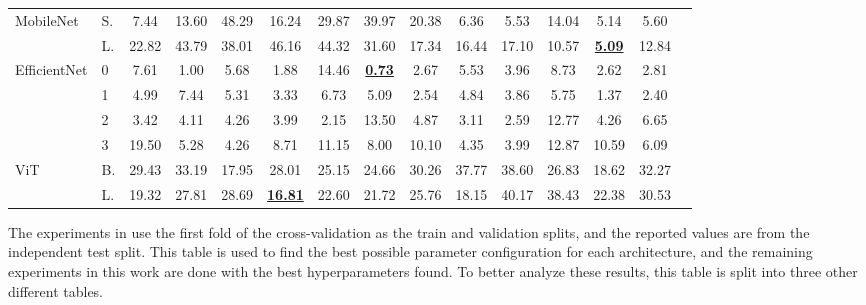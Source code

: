 \begin{table}[t!]
\begin{tabular}{llcccccc|ccccccc}
        \midrule
        \multirow{2}{*}{MobileNet} & S. & 7.44 & 13.60 & 48.29 & 16.24 & 29.87 & 39.97 & 20.38 & 6.36 & 5.53 & 14.04 & 5.14 & 5.60 \\
                                & L. & 22.82 & 43.79 & 38.01 & 46.16 & 44.32 & 31.60 & 17.34 & 16.44 & 17.10 & 10.57 & \underline{\textbf{5.09}} & 12.84 \\
        \midrule
        \multirow{4}{*}{EfficientNet} & 0  & 7.61 & 1.00 & 5.68 & 1.88 & 14.46 & \underline{\textbf{0.73}} & 2.67 & 5.53 & 3.96 & 8.73 & 2.62 & 2.81 \\
                                    & 1  & 4.99 & 7.44 & 5.31 & 3.33 & 6.73 & 5.09 & 2.54 & 4.84 & 3.86 & 5.75 & 1.37 & 2.40 \\
                                    & 2  & 3.42 & 4.11 & 4.26 & 3.99 & 2.15 & 13.50 & 4.87 & 3.11 & 2.59 & 12.77 & 4.26 & 6.65 \\
                                    & 3  & 19.50 & 5.28 & 4.26 & 8.71 & 11.15 & 8.00 & 10.10 & 4.35 & 3.99 & 12.87 & 10.59 & 6.09 \\
        \midrule
        \multirow{2}{*}{ViT}    & B.  & 29.43 & 33.19 & 17.95 & 28.01 & 25.15 & 24.66 & 30.26 & 37.77 & 38.60 & 26.83 & 18.62 & 32.27 \\
                                & L. & 19.32 & 27.81 & 28.69 & \underline{\textbf{16.81}} & 22.60 & 21.72 & 25.76 & 18.15 & 40.17 & 38.43 & 22.38 & 30.53 \\
        \bottomrule
    \end{tabular}
\end{table}

The experiments in  use the first fold of the cross-validation as the train and validation splits, and the reported values are from the independent test split. This table is used to find the best possible parameter configuration for each architecture, and the remaining experiments in this work are done with the best hyperparameters found. To better analyze these results, this table is split into three other different tables.

